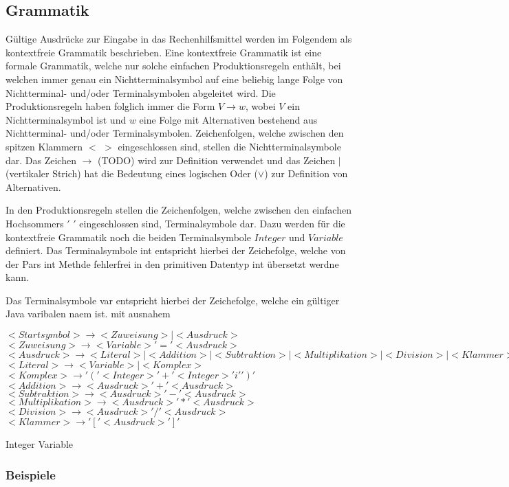 \documentclass{sdqassignment}
\begin{document}
\subsection{Grammatik}
Gültige Ausdrücke zur Eingabe in das Rechenhilfsmittel werden im Folgendem als kontextfreie Grammatik beschrieben. Eine kontextfreie Grammatik ist eine formale Grammatik, welche nur solche einfachen Produktionsregeln enthält, bei welchen immer genau ein Nichtterminalsymbol auf eine beliebig lange Folge von Nichtterminal- und/oder Terminalsymbolen abgeleitet wird. Die Produktionsregeln haben folglich immer die Form \(V \rightarrow w\), wobei \(V\) ein Nichtterminalsymbol ist und \(w\) eine Folge mit Alternativen bestehend aus Nichtterminal- und/oder Terminalsymbolen. Zeichenfolgen, welche zwischen den spitzen Klammern \(<\) \(>\) eingeschlossen sind, stellen die Nichtterminalsymbole dar. Das Zeichen \(\rightarrow\) (TODO) wird zur Definition verwendet und das Zeichen \(\mid\) (vertikaler Strich) hat die Bedeutung eines logischen Oder (\(\lor\)) zur Definition von Alternativen.

In den Produktionsregeln stellen die Zeichenfolgen, welche zwischen den einfachen Hochsommers \('\) \('\) eingeschlossen sind, Terminalsymbole dar. Dazu werden für die kontextfreie Grammatik noch die beiden Terminalsymbole \(Integer\) und \(Variable\) definiert. Das Terminalsymbole int entspricht hierbei der Zeichefolge, welche von der Pars int Methde fehlerfrei in den primitiven Datentyp int übersetzt werdne kann.

Das Terminalsymbole var entspricht hierbei der Zeichefolge, welche ein gültiger Java varibalen naem ist.
mit ausnahem





\(<Startsymbol> \rightarrow <Zuweisung> \mid <Ausdruck>\)
\(<Zuweisung> \rightarrow <Variable> '=' <Ausdruck>\)
\(<Ausdruck> \rightarrow <Literal> \mid <Addition> \mid <Subtraktion> \mid <Multiplikation> \mid <Division> \mid <Klammer>\)
\(<Literal> \rightarrow <Variable> \mid <Komplex>\)
\(<Komplex> \rightarrow '(' <Integer> '+' <Integer> 'i' ')'\)
\(<Addition> \rightarrow <Ausdruck> '+' <Ausdruck>\)
\(<Subtraktion> \rightarrow <Ausdruck> '-' <Ausdruck>\)
\(<Multiplikation> \rightarrow <Ausdruck> '*' <Ausdruck>\)
\(<Division> \rightarrow <Ausdruck> '/' <Ausdruck>\)
\(<Klammer> \rightarrow '[' <Ausdruck> ']'\)

Integer \rightarrow
Variable \rightarrow




\subsubsection{Beispiele}
\end{document}
